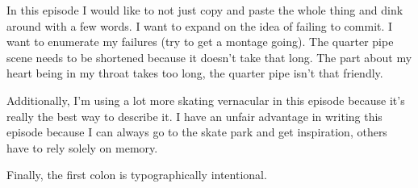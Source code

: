 In this episode I would like to not just copy and paste the whole thing and dink around with a few words. I want to expand on the idea of failing to commit. I want to enumerate my failures (try to get a montage going). The quarter pipe scene needs to be shortened because it doesn't take that long. The part about my heart being in my throat takes too long, the quarter pipe isn't that friendly.

Additionally, I'm using a lot more skating vernacular in this episode because it's really the best way to describe it. I have an unfair advantage in writing this episode because I can always go to the skate park and get inspiration, others have to rely solely on memory.

Finally, the first colon is typographically intentional.
